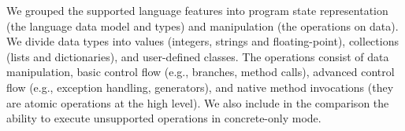 We grouped the supported language features into program state representation (the language data model and types) and manipulation (the operations on data).  We divide data types into values (integers, strings and floating-point), collections (lists and dictionaries), and user-defined classes.  The operations consist of data manipulation, basic control flow (e.g., branches, method calls), advanced control flow (e.g., exception handling, generators), and native method invocations (they are atomic operations at the high level).  We also include in the comparison the ability to execute unsupported operations in concrete-only mode.


\newcommand{\compsupp}{\ensuremath{\CIRCLE}}
\newcommand{\partsupp}{\ensuremath{\LEFTcircle}}
\newcommand{\unsupp}{\ensuremath{\Circle}}

